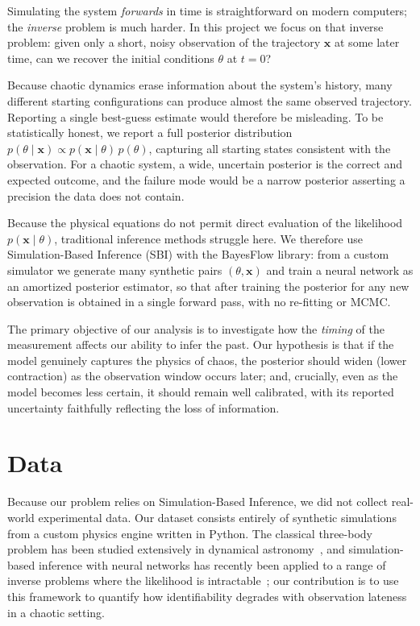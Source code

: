\documentclass[12pt]{article}
\begin{document}

Simulating the system \emph{forwards} in time is straightforward on modern computers;
the \emph{inverse} problem is much harder. In this project we focus on that inverse
problem: given only a short, noisy observation of the trajectory $\mathbf{x}$ at some
later time, can we recover the initial conditions $\theta$ at $t=0$?
 
Because chaotic dynamics erase information about the system's history, many different
starting configurations can produce almost the same observed trajectory. Reporting a
single best-guess estimate would therefore be misleading. To be statistically honest,
we report a full posterior distribution
$p(\theta \mid \mathbf{x}) \propto p(\mathbf{x} \mid \theta)\, p(\theta)$, capturing
all starting states consistent with the observation. For a chaotic system, a wide,
uncertain posterior is the correct and expected outcome, and the failure mode would be a
narrow posterior asserting a precision the data does not contain.
 
Because the physical equations do not permit direct evaluation of the likelihood
$p(\mathbf{x} \mid \theta)$, traditional inference methods struggle here. We therefore
use Simulation-Based Inference (SBI) with the BayesFlow library: from a custom
simulator we generate many synthetic pairs $(\theta, \mathbf{x})$ and train a neural
network as an amortized posterior estimator, so that after training the posterior for
any new observation is obtained in a single forward pass, with no re-fitting or MCMC.
 
The primary objective of our analysis is to investigate how the \emph{timing} of the
measurement affects our ability to infer the past. Our hypothesis is that if the model
genuinely captures the physics of chaos, the posterior should widen (lower contraction)
as the observation window occurs later; and, crucially, even as the model becomes less
certain, it should remain well calibrated, with its reported uncertainty faithfully
reflecting the loss of information.

\section{Data}

Because our problem relies on Simulation-Based Inference, we did not collect real-world
experimental data. Our dataset consists entirely of synthetic simulations from a custom
physics engine written in Python. The classical three-body problem has been studied
extensively in dynamical astronomy~\cite{valtonen2006}, and simulation-based inference
with neural networks has recently been applied to a range of inverse problems where the
likelihood is intractable~\cite{radev2023}; our contribution is to use this framework to
quantify how identifiability degrades with observation lateness in a chaotic setting.
 
\end{document}
